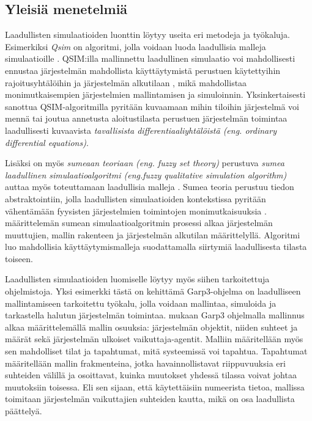 \documentclass[utf8]{gradu3}
\begin{document}
\subsection{Yleisiä menetelmiä}

Laadullisten simulaatioiden luonttin löytyy useita eri metodeja ja työkaluja.
Esimerkiksi \textit{Qsim} on algoritmi, jolla voidaan luoda laadullisia malleja simulaatioille
\parencite{kuipers1986qualitative}. 
QSIM:illa mallinnettu laadullinen simulaatio voi mahdollisesti ennustaa 
järjestelmän mahdollista käyttäytymistä perustuen käytettyihin rajoitusyhtälöihin 
ja järjestelmän alkutilaan \parencite{kuipers1986qualitative}, mikä mahdollistaa
monimutkaisempien järjestelmien mallintamisen ja simuloinnin.
Yksinkertaisesti sanottua QSIM-algoritmilla pyritään kuvaamaan mihin tiloihin
järjestelmä voi mennä tai joutua annetusta aloitustilasta 
perustuen järjestelmän toimintaa laadullisesti kuvaavista 
\textit{ tavallisista differentiaaliyhtälöistä 
(eng. ordinary differential equations)}.

Lisäksi on myös \textit{sumeaan teoriaan (eng. fuzzy set theory)} 
perustuva \textit{sumea laadullinen simulaatioalgoritmi 
(eng.fuzzy qualitative simulation algorithm)} 
auttaa myös toteuttamaan laadullisia malleja \parencite{shen1993fuzzy}.
Sumea teoria perustuu tiedon abstraktointiin, 
jolla laadullisten simulaatioiden kontekstissa pyritään vähentämään 
fyysisten järjestelmien toimintojen monimutkaisuuksia
\parencite{shen1993fuzzy}. 
\textcite{shen1993fuzzy} määrittelemän sumean simulaatioalgoritmin 
prosessi alkaa järjestelmän muuttujien, 
mallin rakenteen ja järjestelmän alkutilan määrittelyllä. 
Algoritmi luo mahdollisia käyttäytymismalleja suodattamalla siirtymiä laadullisesta tilasta
toiseen.

Laadullisten simulaatioiden luomiselle löytyy myös siihen tarkoitettuja ohjelmistoja.
Yksi esimerkki tästä on \textcite{bredeweg2007garp3} kehittämä Garp3-ohjelma on laadulliseen 
mallintamiseen tarkoitettu työkalu, jolla voidaan mallintaa, simuloida ja
tarkastella halutun järjestelmän toimintaa. 
\textcite{bredeweg2007garp3} mukaan Garp3 ohjelmalla mallinnus alkaa
määrittelemällä mallin osuuksia: 
järjestelmän objektit, niiden suhteet ja määrät sekä järjestelmän ulkoiset vaikuttaja-agentit.
Malliin määritellään myös sen mahdolliset tilat ja tapahtumat, mitä systeemissä voi tapahtua.
Tapahtumat määritellään mallin frakmenteina, 
jotka havainnollistavat riippuvuuksia  eri suhteiden välillä ja osoittavat, 
kuinka muutokset yhdessä tilassa voivat johtaa muutoksiin toisessa.
Eli sen sijaan, että käytettäisiin numeerista tietoa, mallissa toimitaan
järjestelmän vaikuttajien suhteiden kautta, mikä on osa laadullista päättelyä.
\end{document}
